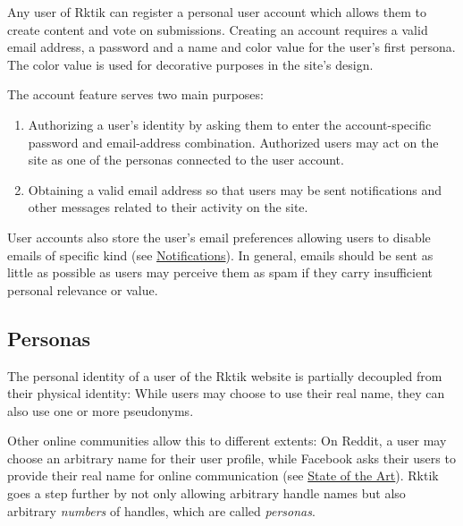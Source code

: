 
Any user of Rktik can register a personal user account which allows them
to create content and vote on submissions. Creating an account requires
a valid email address, a password and a name and color value for the
user's first persona. The color value is used for decorative purposes in
the site's design.

The account feature serves two main purposes:

\begin{enumerate}
\def\labelenumi{\arabic{enumi}.}
\tightlist
\item
  Authorizing a user's identity by asking them to enter the
  account-specific password and email-address combination. Authorized
  users may act on the site as one of the personas connected to the user
  account.
\item
  Obtaining a valid email address so that users may be sent
  notifications and other messages related to their activity on the
  site.
\end{enumerate}

User accounts also store the user's email preferences allowing users to
disable emails of specific kind (see
\hyperref[notifications-1]{Notifications}). In general, emails should be
sent as little as possible as users may perceive them as spam if they
carry insufficient personal relevance or value.

\subsection{Personas}\label{personas}

The personal identity of a user of the Rktik website is partially
decoupled from their physical identity: While users may choose to use
their real name, they can also use one or more pseudonyms.

Other online communities allow this to different extents: On Reddit, a
user may choose an arbitrary name for their user profile, while Facebook
asks their users to provide their real name for online communication
(see \hyperref[state-of-the-art]{State of the Art}). Rktik goes a step
further by not only allowing arbitrary handle names but also arbitrary
\emph{numbers} of handles, which are called \emph{personas}.

